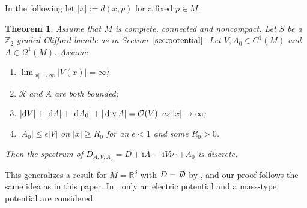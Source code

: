 \documentclass[10pt,a4paper]{amsart}
\numberwithin{equation}{section}
\newtheorem{Theorem}{Theorem}[section]
\begin{document}
In the following let $|x|:= d(x,p)$ for a fixed $p\in M$.


\begin{Theorem}\label{thm_pot} Assume that $M$ is complete, connected and noncompact. Let $S$ be a $\mathbb Z_2$-graded Clifford bundle as in Section~$\ref{sec:potential}$. Let $V, A_0\in C^1(M)$ and $A\in \Omega^1(M)$.
Assume
\begin{enumerate}[$(i)$]\itemsep=0pt
		\item $\lim_{|x|\to \infty} |{V}(x)|=\infty$;
		\item $\mathcal{R}$ and $A$ are both bounded;
		\item $|{\rm d}V| + |{\rm d}A| + |{\rm d}A_0|+ |\operatorname{div} A|= \mathcal{O}(V)$ as $|x|\to \infty$;
		\item $|A_0|\leq \epsilon |V|$ on $|x|\geq R_0$ for an $\epsilon <1$ and some $R_0>0$.
\end{enumerate}
Then the spectrum of $D_{A,V, A_0}= D +{\mathrm{i}}A\cdot + {\mathrm{i}}V\nu \cdot +A_0$ is discrete.
\end{Theorem}


This generalizes a result for $M={\mathbb R}^3$ with $D={\slashed{D}}$ by \cite{Yamada}, and our proof follows the same idea as in this paper. In \cite{Yamada}, only an electric potential and a mass-type potential are considered.
\end{document}
